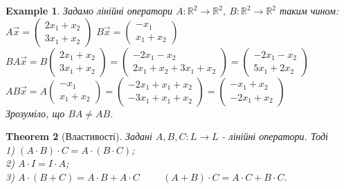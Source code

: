 \documentclass[a4paper, 10pt]{article}
\theoremstyle{theoremdd}
\newtheorem{theorem}{Theorem}[subsection]
\newtheorem{example}[theorem]{Example}
\begin{document}
	\begin{example}
	Задамо лінійні оператори $A: \mathbb{R}^2 \to \mathbb{R}^2$, $B: \mathbb{R}^2 \to \mathbb{R}^2$ таким чином:\\
	$A \vec{x} = \begin{pmatrix}
	2x_1 + x_2 \\ 3x_1 + x_2
	\end{pmatrix}$ \hspace{1cm} $B \vec{x} = \begin{pmatrix}
	-x_1 \\ x_1 + x_2
	\end{pmatrix}$\\
	$BA \vec{x} = B \begin{pmatrix}
	2x_1 + x_2 \\ 3x_1 + x_2
	\end{pmatrix} = \begin{pmatrix}
	-2x_1-x_2 \\ 2x_1+x_2+3x_1+x_2
	\end{pmatrix} = \begin{pmatrix}
	-2x_1-x_2 \\ 5x_1+2x_2
	\end{pmatrix}$\\
	$AB \vec{x} = A \begin{pmatrix}
	-x_1 \\ x_1 + x_2
	\end{pmatrix} = \begin{pmatrix}
	-2x_1 + x_1 + x_2 \\ -3x_1 + x_1 + x_2
	\end{pmatrix} = \begin{pmatrix}
	-x_1 + x_2 \\ -2x_1 + x_2
	\end{pmatrix}$\\
	Зрозуміло, що $BA \neq AB$.
	\end{example}
	
	\begin{theorem}[Властивості]
	Задані $A,B,C: L \to L$ - лінійні оператори. Тоді\\
	1) $(A \cdot B) \cdot C = A \cdot (B \cdot C)$;\\
	2) $A \cdot I = I \cdot A$;\\
	3) $A \cdot (B+C) = A \cdot B + A \cdot C \hspace{1cm} (A+B) \cdot C = A \cdot C + B \cdot C$.
	\end{theorem}
	
\end{document}
